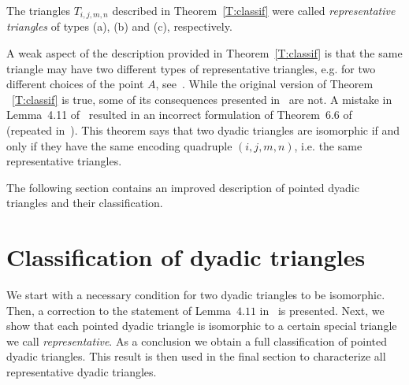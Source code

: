 \documentclass[12pt]{amsart}
\theoremstyle{plain}
\theoremstyle{definition}
\numberwithin{equation}{section}
\begin{document}
The triangles $T_{i,j,m,n}$ described in Theorem~\ref{T:classif} were
called \emph{representative triangles} of types (a), (b) and (c), respectively.


A weak aspect of the description provided in Theorem~\ref{T:classif} is that the same triangle may
have two different types of representative triangles, e.g. for two different choices of
the point $A$, see~\cite{MMR19a}. While the original version of Theorem
~\ref{T:classif} is true, some of its consequences presented in~\cite{MRS11} are not. A
mistake in Lemma~4.11 of~\cite{MRS11} resulted in an incorrect formulation of Theorem~6.6 of
~\cite{MRS11} (repeated in~\cite{MMR19a}). This theorem says that two dyadic triangles are isomorphic if and only if they
have the same encoding quadruple $(i,j,m,n)$, i.e. the same representative triangles.

The following section contains an improved description of pointed dyadic triangles and   their  classification.


\section{Classification of dyadic triangles}\label{S:ClassifTriangles}

We start with a necessary condition for two dyadic triangles to be
isomorphic. Then, a correction to the statement of Lemma~$4.11$ in~\cite{MRS11} is presented.
Next, we show that each pointed dyadic triangle is isomorphic to a certain special triangle we call \emph{representative}. As a conclusion we obtain a full classification of   pointed   dyadic triangles. This result is then used in the final section to characterize all representative dyadic triangles.
\end{document}
